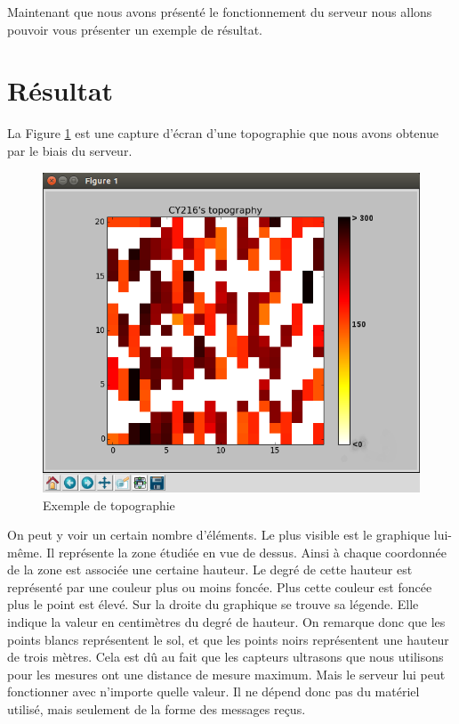 \documentclass[a4paper,10pt]{report}
\begin{document}
      Maintenant que nous avons présenté le fonctionnement du serveur nous 
allons pouvoir vous présenter un exemple de résultat.

    \section{Résultat}
      La Figure \ref{exemple_topo} est une capture d'écran d'une topographie 
que 
nous avons obtenue par le biais du serveur.

	\begin{figure}[htbp]
	  \centering
	  \includegraphics[scale=0.4]{img/topography_example.png}
	  \caption{Exemple de topographie}
	  \label{exemple_topo}
	\end{figure}
	
      On peut y voir un certain nombre d'éléments. Le plus visible est le 
graphique lui-même. Il représente la zone étudiée en vue de dessus. Ainsi à 
chaque coordonnée de la zone est associée une certaine hauteur. Le degré de 
cette hauteur est représenté par une couleur plus ou moins foncée. Plus cette 
couleur est foncée plus le point est élevé. Sur la droite du graphique se 
trouve sa légende. Elle indique la valeur en centimètres du degré de hauteur. 
On remarque donc que les points blancs représentent le sol, et que les points 
noirs représentent une hauteur de trois mètres. Cela est dû au fait que les 
capteurs ultrasons que nous utilisons pour les mesures ont une distance de 
mesure maximum. Mais le serveur lui peut fonctionner avec n'importe quelle 
valeur. Il ne dépend donc pas du matériel utilisé, mais seulement de la forme 
des messages reçus.
\end{document}
